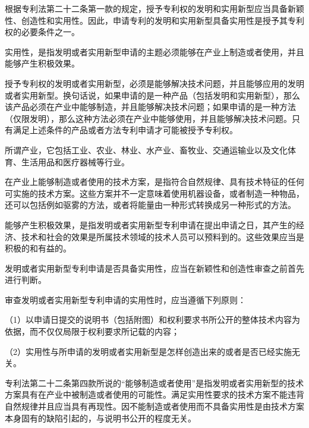 根据专利法第二十二条第一款的规定，授予专利权的发明和实用新型应当具备新颖性、创造性和实用性。因此，申请专利的发明和实用新型具备实用性是授予其专利权的必要条件之一。

实用性，是指发明或者实用新型申请的主题必须能够在产业上制造或者使用，并且能够产生积极效果。

授予专利权的发明或者实用新型，必须是能够解决技术问题，并且能够应用的发明或者实用新型。换句话说，如果申请的是一种产品（包括发明和实用新型），那么该产品必须在产业中能够制造，并且能够解决技术问题；如果申请的是一种方法（仅限发明），那么这种方法必须在产业中能够使用，并且能够解决技术问题。只有满足上述条件的产品或者方法专利申请才可能被授予专利权。

所谓产业，它包括工业、农业、林业、水产业、畜牧业、交通运输业以及文化体育、生活用品和医疗器械等行业。

在产业上能够制造或者使用的技术方案，是指符合自然规律、具有技术特征的任何可实施的技术方案。这些方案并不一定意味着使用机器设备，或者制造一种物品，还可以包括例如驱雾的方法，或者将能量由一种形式转换成另一种形式的方法。

能够产生积极效果，是指发明或者实用新型专利申请在提出申请之日，其产生的经济、技术和社会的效果是所属技术领域的技术人员可以预料到的。这些效果应当是积极的和有益的。

发明或者实用新型专利申请是否具备实用性，应当在新颖性和创造性审查之前首先进行判断。

审查发明或者实用新型专利申请的实用性时，应当遵循下列原则：

{\setlength{\parindent}{17.1bp}（1）以申请日提交的说明书（包括附图）和权利要求书所公开的整体技术内容为依据，而不仅仅局限于权利要求所记载的内容；\par}

{\setlength{\parindent}{17.1bp}（2）实用性与所申请的发明或者实用新型是怎样创造出来的或者是否已经实施无关。\par}

专利法第二十二条第四款所说的“能够制造或者使用”是指发明或者实用新型的技术方案具有在产业中被制造或者使用的可能性。满足实用性要求的技术方案不能违背自然规律并且应当具有再现性。因不能制造或者使用而不具备实用性是由技术方案本身固有的缺陷引起的，与说明书公开的程度无关。

